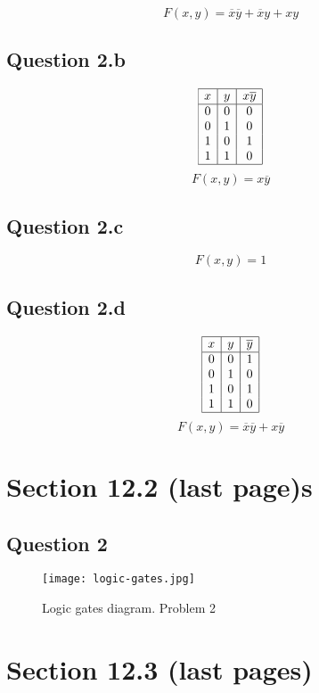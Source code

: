 \documentclass{article}
\begin{document}
\[
F(x, y) = \overline{x} \overline{y} + \overline{x} y + x y
\]

\subsection*{Question 2.b}
\[
\begin{array}{|c|c|c|}
\hline
x & y & x \overline{y} \\
\hline
0 & 0 & 0 \\
0 & 1 & 0 \\
1 & 0 & 1 \\
1 & 1 & 0 \\
\hline
\end{array}
\]
\[
F(x, y) = x \overline{y}
\]

\subsection*{Question 2.c}
\[
F(x, y) = 1
\]

\subsection*{Question 2.d}
\[
\begin{array}{|c|c|c|}
\hline
x & y & \overline{y} \\
\hline
0 & 0 & 1 \\
0 & 1 & 0 \\
1 & 0 & 1 \\
1 & 1 & 0 \\
\hline
\end{array}
\]
\[
F(x, y) = \overline{x} \overline{y} + x \overline{y}
\]

\section*{Section 12.2 (last page)s}

\subsection*{Question 2}
\begin{figure}[h!]
\centering
\texttt{[image: logic-gates.jpg]}
\caption{Logic gates diagram. Problem 2}
\label{fig:logic-gates}
\end{figure}

\section*{Section 12.3 (last pages)}
\end{document}
